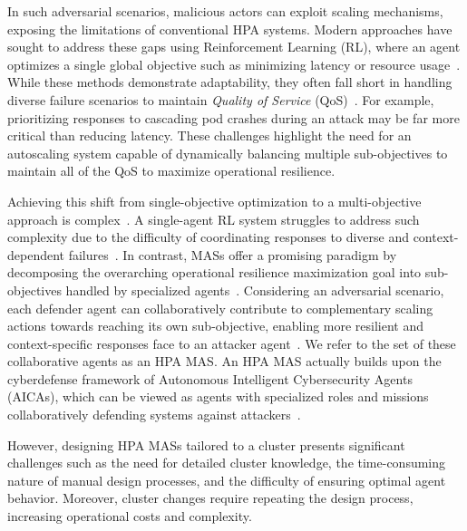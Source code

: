 \documentclass[conference]{IEEEtran}
\begin{document}
In such adversarial scenarios, malicious actors can exploit scaling mechanisms, exposing the limitations of conventional HPA systems. Modern approaches have sought to address these gaps using Reinforcement Learning (RL), where an agent optimizes a single global objective such as minimizing latency or resource usage~\cite{Gari2021}. While these methods demonstrate adaptability, they often fall short in handling diverse failure scenarios to maintain \textit{Quality of Service} (QoS)~\cite{Liu2024}. For example, prioritizing responses to cascading pod crashes during an attack may be far more critical than reducing latency. These challenges highlight the need for an autoscaling system capable of dynamically balancing multiple sub-objectives to maintain all of the QoS to maximize operational resilience.

Achieving this shift from single-objective optimization to a multi-objective approach is complex~\cite{Shoham2009MAS}. A single-agent RL system struggles to address such complexity due to the difficulty of coordinating responses to diverse and context-dependent failures~\cite{Jennings1998}. In contrast, MASs offer a promising paradigm by decomposing the overarching operational resilience maximization goal into sub-objectives handled by specialized agents~\cite{Shoham2009MAS}. Considering an adversarial scenario, each defender agent can collaboratively contribute to complementary scaling actions towards reaching its own sub-objective, enabling more resilient and context-specific responses face to an attacker agent~\cite{Jennings1998}. We refer to the set of these collaborative agents as an HPA MAS. An HPA MAS actually builds upon the cyberdefense framework of Autonomous Intelligent Cybersecurity Agents (AICAs), which can be viewed as agents with specialized roles and missions collaboratively defending systems against attackers~\cite{Kott2018}.

However, designing HPA MASs tailored to a cluster presents significant challenges such as the need for detailed cluster knowledge, the time-consuming nature of manual design processes, and the difficulty of ensuring optimal agent behavior. Moreover, cluster changes require repeating the design process, increasing operational costs and complexity.
\end{document}

